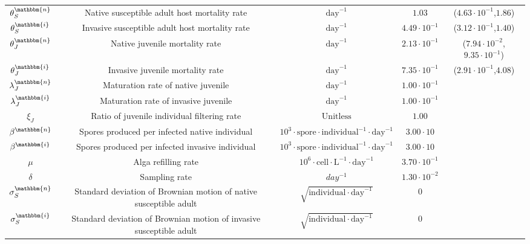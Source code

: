 \documentclass[aoas,preprint]{imsart}\usepackage[]{graphicx}\usepackage[]{xcolor}
\newcommand\native{\mathbbm{n}}
\newcommand\invasive{\mathbbm{i}}
\begin{document}
\begin{table}[H]
{\begin{tabular}{||c|c |c|c|c||}
$\theta^{\native}_{S}$ & Native susceptible adult host mortality rate     &     $  \mathrm{day}^{-1}$     & $1.03$  & ($4.63\cdot 10^{-1}$,$1.86$)\\
$\theta^{\invasive}_{S}$ & Invasive susceptible adult host mortality rate   &     $  \mathrm{day}^{-1}$     & $4.49\cdot 10^{-1}$  & ($3.12\cdot 10^{-1}$,$1.40$)\\
$\theta^{\native}_{J}$ & Native juvenile mortality rate        &     $   \mathrm{day}^{-1}$     & $2.13\cdot 10^{-1}$  & ($7.94\cdot 10^{-2}$,$9.35\cdot 10^{-1}$)\\
$\theta^{\invasive}_{J}$ & Invasive juvenile mortality rate      &     $  \mathrm{day}^{-1}$     & $7.35\cdot 10^{-1}$  & ($2.91\cdot 10^{-1}$,$4.08$)\\
$\lambda^{\native}_{J}$ & Maturation rate of native juvenile                  &     $ \mathrm{day}^{-1} $                  & $1.00\cdot 10^{-1}$  & \\
$\lambda^{\invasive}_{J}$ & Maturation rate of invasive juvenile                &     $ \mathrm{day}^{-1} $                  & $1.00\cdot 10^{-1}$  & \\
$\xi_J$         & Ratio of juvenile individual filtering rate &     $\mathrm{Unitless}$                    & $1.00$ & \\
$\beta^{\native}$       & Spores produced per infected native individual     &  $10^3 \cdot \mathrm{spore} \cdot \mathrm{individual}^{-1} \cdot \mathrm{day}^{-1}$  & $3.00\cdot 10$ & \\
$\beta^{\invasive}$       & Spores produced per infected invasive individual   &  $10^3 \cdot \mathrm{spore} \cdot \mathrm{individual}^{-1} \cdot \mathrm{day}^{-1}$  & $3.00\cdot 10$ & \\
$\mu$           & Alga refilling rate                                &  $10^6 \cdot \mathrm{cell} \cdot \mathrm{L} ^{-1} \cdot \mathrm{day}^{-1}$                 & $3.70\cdot 10^{-1}$ & \\
$\delta$        & Sampling rate                                      &  $day ^{-1}$                                                                         & $1.30\cdot 10^{-2}$ & \\
$\sigma^{\native}_{S}$ & Standard deviation of Brownian motion of native susceptible adult             &   $\sqrt{\mathrm{individual} \cdot \mathrm{day}^{-1}}$  & 0  & \\
$\sigma^{\invasive}_{S}$ & Standard deviation of Brownian motion of invasive susceptible adult              &   $\sqrt{\mathrm{individual} \cdot \mathrm{day}^{-1}}$  & 0  & \\

\end{tabular}}
\end{table}
\end{document}
